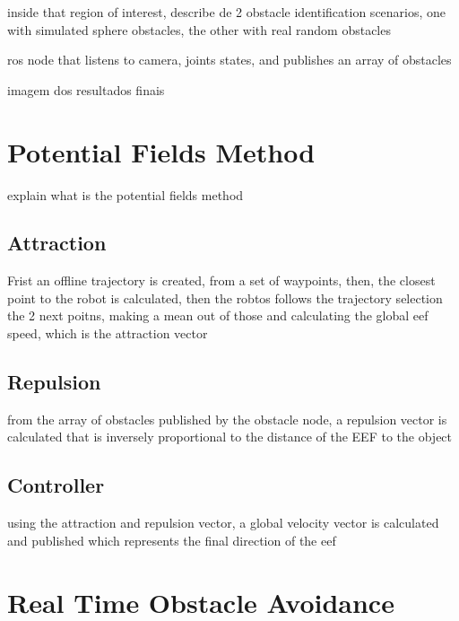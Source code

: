\par inside that region of interest, describe de 2 obstacle identification scenarios, one with simulated sphere obstacles, the other with real random obstacles

\par ros node that listens to camera, joints states, and publishes an array of obstacles

\par imagem dos resultados finais

\section{Potential Fields Method}
\label{section:pf-method}

\par explain what is the potential fields method

\subsection{Attraction}

\par Frist an offline trajectory is created, from a set of waypoints, then, the closest point to the robot is calculated, then the robtos follows the trajectory selection the 2 next poitns, making a mean out of those and calculating the global eef speed, which is the attraction vector

\subsection{Repulsion}

\par from the array of obstacles published by the obstacle node, a repulsion vector is calculated that is inversely proportional to the distance of the EEF to the object

\subsection{Controller}

\par using the attraction and repulsion vector, a global velocity vector is calculated and published which represents the final direction of the eef 

\section{Real Time Obstacle Avoidance}

